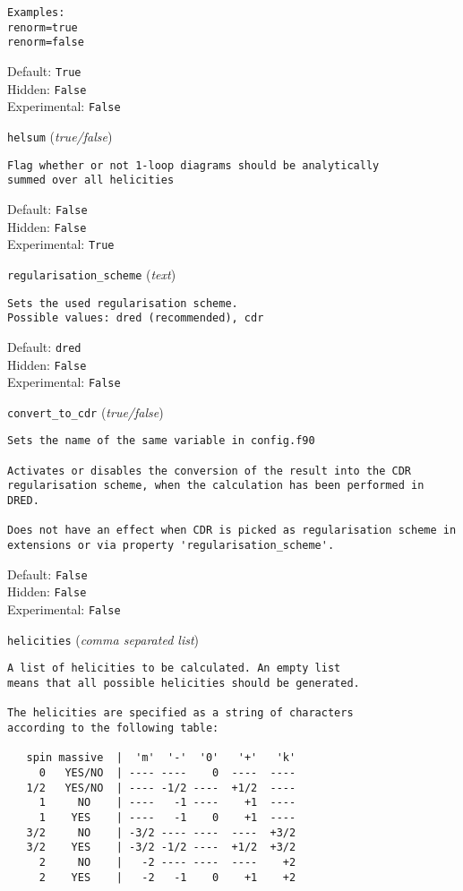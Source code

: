 \begin{basedescript}{\desclabelstyle{\pushlabel}}
\begin{verbatim}
Examples:
renorm=true
renorm=false
\end{verbatim}
Default: \verb|True|
\\Hidden: \verb|False|
\\Experimental: \verb|False|
\\\item[\colorbox{gray!30}{\texttt{helsum}}] (\textit{true/false})
\begin{verbatim}
Flag whether or not 1-loop diagrams should be analytically
summed over all helicities
\end{verbatim}
Default: \verb|False|
\\Hidden: \verb|False|
\\Experimental: \verb|True|
\\\item[\colorbox{gray!30}{\texttt{regularisation\_scheme}}] (\textit{text})
\begin{verbatim}
Sets the used regularisation scheme.
Possible values: dred (recommended), cdr
\end{verbatim}
Default: \verb|dred|
\\Hidden: \verb|False|
\\Experimental: \verb|False|
\\\item[\colorbox{gray!30}{\texttt{convert\_to\_cdr}}] (\textit{true/false})
\begin{verbatim}
Sets the name of the same variable in config.f90

Activates or disables the conversion of the result into the CDR
regularisation scheme, when the calculation has been performed in DRED.

Does not have an effect when CDR is picked as regularisation scheme in
extensions or via property 'regularisation_scheme'.
\end{verbatim}
Default: \verb|False|
\\Hidden: \verb|False|
\\Experimental: \verb|False|
\\\item[\colorbox{gray!30}{\texttt{helicities}}] (\textit{comma separated list})
\begin{verbatim}
A list of helicities to be calculated. An empty list
means that all possible helicities should be generated.

The helicities are specified as a string of characters
according to the following table:

   spin massive  |  'm'  '-'  '0'   '+'   'k'
     0   YES/NO  | ---- ----    0  ----  ----
   1/2   YES/NO  | ---- -1/2 ----  +1/2  ----
     1     NO    | ----   -1 ----    +1  ----
     1    YES    | ----   -1    0    +1  ----
   3/2     NO    | -3/2 ---- ----  ----  +3/2
   3/2    YES    | -3/2 -1/2 ----  +1/2  +3/2
     2     NO    |   -2 ---- ----  ----    +2
     2    YES    |   -2   -1    0    +1    +2


\end{verbatim}
\end{basedescript}
